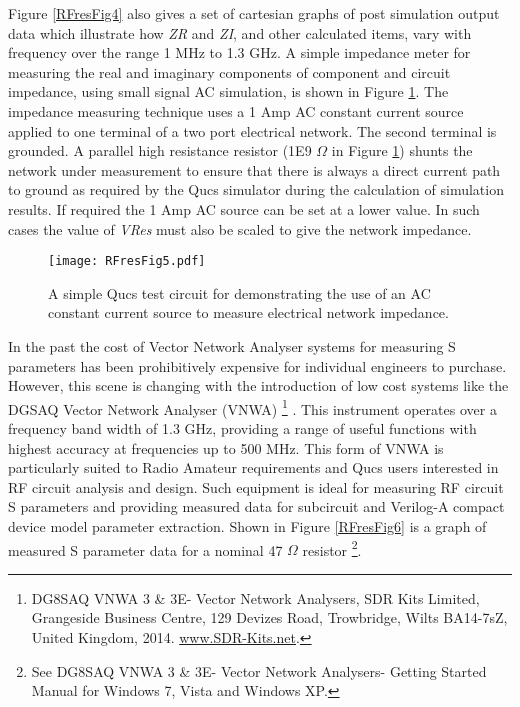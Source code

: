 Figure \ref{RFresFig4} also gives a set of cartesian graphs of post simulation output data which illustrate how \textit{ZR} and \textit{ZI}, and other calculated items, vary with frequency
over the range 1 MHz to 1.3 GHz.
A simple impedance meter for measuring the real and imaginary components of component and circuit impedance, using small signal AC simulation, is shown in Figure \ref{RFresFig5}.
The impedance measuring technique uses a 1 Amp AC constant current source applied to one terminal of a two port electrical network.
The second terminal is grounded.
A parallel high resistance resistor (1E9 $\Omega$ in Figure \ref{RFresFig5}) shunts the network under measurement to ensure that there is always a direct current path to ground as required by
the Qucs simulator during the calculation of simulation results.
If required the 1 Amp AC source can be set at a lower value. In such cases the value of \textit{VRes} must also be scaled to give the network impedance.
\begin{figure}[h]
\begin{center}
	\texttt{[image: RFresFig5.pdf]}
	\caption{A simple Qucs test circuit for demonstrating the use of an AC constant current source to measure electrical network impedance.}
	\label{RFresFig5}
\end{center}
\end{figure}
In the past the cost of Vector Network Analyser systems for measuring S parameters has been prohibitively expensive for individual engineers to purchase.
However, this scene is changing with the introduction of low cost systems like the  DGSAQ Vector Network Analyser (VNWA) \footnote{DG8SAQ VNWA 3 \& 3E- Vector Network Analysers, SDR Kits
Limited, Grangeside Business Centre, 129 Devizes Road, Trowbridge, Wilts
BA14-7sZ, United Kingdom, 2014. \url{www.SDR-Kits.net}.} .
This instrument operates over a frequency band width of 1.3 GHz, providing a range of useful functions with highest accuracy at frequencies up to 500 MHz.
This form of VNWA is particularly suited to Radio Amateur requirements and Qucs users interested in RF circuit analysis and design.
Such equipment is ideal for measuring RF circuit S parameters and providing measured data for subcircuit and Verilog-A compact device model parameter extraction.
Shown in Figure \ref{RFresFig6} is a graph of measured S parameter data for a nominal 47 $\Omega$ resistor \footnote{See DG8SAQ VNWA 3 \& 3E- Vector Network Analysers-
Getting Started Manual for Windows 7, Vista and Windows XP.}.
